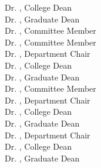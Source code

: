\begin{titlepage}
Dr. \colldean, College Dean\\
Dr. \graddean, Graduate Dean\\
\else
\ifdefined\commemb
Dr. \commema, Committee Member\\
Dr. \commemb, Committee Member\\
Dr. \depchair, Department Chair\\
Dr. \colldean, College Dean\\
Dr. \graddean, Graduate Dean\\
\else
\ifdefined\commema
Dr. \commema, Committee Member\\
Dr. \depchair, Department Chair\\
Dr. \colldean, College Dean\\
Dr. \graddean, Graduate Dean\\
\else
Dr. \depchair, Department Chair\\
Dr. \colldean, College Dean\\
Dr. \graddean, Graduate Dean\\
\fi
\fi
\fi
\fi
\fi
\fi
\fi
\fi
\fi
\end{titlepage}


\restoregeometry